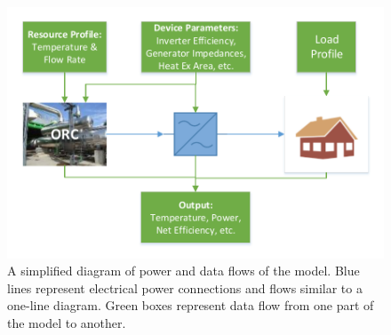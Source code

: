 \begin{figure}[h]
	\centering

	\includegraphics[width=\textwidth]{figures/Abridged Pilgrim Model Flow diagram - AC bus.pdf} 

	\caption{A simplified diagram of power and data flows of the model. Blue lines represent electrical power connections and flows similar to a one-line diagram. Green boxes represent data flow from one part of the model to another.}
	\label{fig:abridged_flow_diagram_label}

\end{figure}